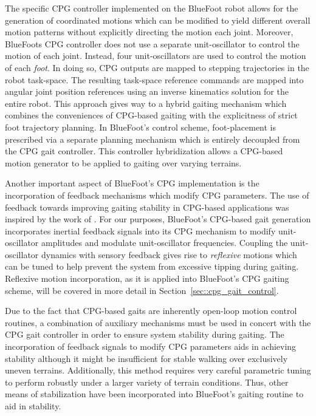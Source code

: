 		The specific CPG controller implemented on the BlueFoot robot allows for the generation of coordinated motions which can be modified to yield different overall motion patterns without explicitly directing the motion each joint. Moreover, BlueFoots CPG controller does not use a separate unit-oscillator to control the motion of each joint. Instead, four unit-oscillators are used to control the motion of each \emph{foot}. In doing so, CPG outputs are mapped to stepping trajectories in the robot task-space. The resulting task-space reference commands are mapped into angular joint position references using an inverse kinematics solution for the entire robot. This approach gives way to a hybrid gaiting mechanism which combines the conveniences of CPG-based gaiting with the explicitness of strict foot trajectory planning. In BlueFoot's control scheme, foot-placement is prescribed via a separate planning mechanism which is entirely decoupled from the CPG gait controller. This controller hybridization allows a CPG-based motion generator to be applied to gaiting over varying terrains.

		Another important aspect of BlueFoot's CPG implementation is the incorporation of feedback mechanisms which modify CPG parameters. The use of feedback towards improving gaiting stability in CPG-based applications was inspired by the work of \cite{Fukuoka2003,Endo2004}. For our purposes, BlueFoot's CPG-based gait generation incorporates inertial feedback signals into its CPG mechanism to modify unit-oscillator amplitudes and modulate unit-oscillator frequencies. Coupling the unit-oscillator dynamics with sensory feedback gives rise to \emph{reflexive} motions which can be tuned to help prevent the system from excessive tipping during gaiting. Reflexive motion incorporation, as it is applied into BlueFoot's CPG gaiting scheme, will be covered in more detail in Section~\ref{sec::cpg_gait_control}.

		Due to the fact that CPG-based gaits are inherently open-loop motion control routines, a combination of auxiliary mechanisms must be used in concert with the CPG gait controller in order to ensure system stability during gaiting. The incorporation of feedback signals to modify CPG parameters aids in achieving stability although it might be insufficient for stable walking over exclusively uneven terrains.  Additionally, this method requires very careful parametric tuning to perform robustly under a larger variety of terrain conditions. Thus, other means of stabilization have been incorporated into BlueFoot's gaiting routine to aid in stability. 

